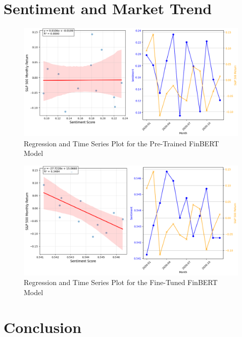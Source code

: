 \documentclass[12pt]{article}
\begin{document}
\section*{Sentiment and Market Trend}

\begin{figure}[h]
	\centering
	\includegraphics[width=1\linewidth]{plots/regression_time_pretrain.png}
	\caption{Regression and Time Series Plot for the Pre-Trained FinBERT Model}
	\label{fig:pretrain_time_regression}
\end{figure}


\begin{figure}[h]
	\centering
	\includegraphics[width=1\linewidth]{plots/regression_time_finetune.png}
	\caption{Regression and Time Series Plot for the Fine-Tuned FinBERT Model}
	\label{fig:finetune_time_regression}
\end{figure}


\section*{Conclusion}
\end{document}
